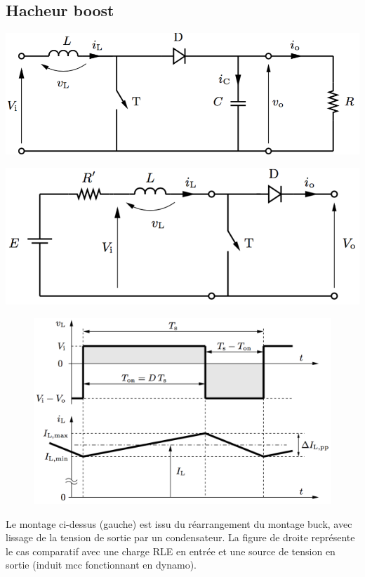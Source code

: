 	\subsection{Hacheur boost}
		\begin{center}
		\begin{minipage}{0.45\textwidth}
			\includegraphics[scale=0.42]{ch5/9}
		\end{minipage}
		\begin{minipage}{0.45\textwidth}
			\includegraphics[scale=0.41]{ch5/10}
		\end{minipage}
		\end{center}
		
		\begin{figure}
		\vspace{-5mm}
		\includegraphics[scale=0.3]{ch5/11}
		\end{figure}	
		Le montage ci-dessus (gauche) est issu du réarrangement du montage buck, avec lissage de la tension de sortie par un condensateur. La figure de droite représente le cas comparatif avec une charge RLE en entrée et une source de tension en sortie (induit mcc fonctionnant en dynamo). 
		
